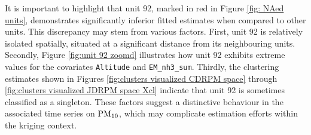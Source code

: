 \documentclass[12pt,	%
	a4paper,		%
	twoside,		%
	openright,		%
	titlepage,%
	]{book}
\theoremstyle{definition}
\begin{document}
It is important to highlight that unit 92, marked in red in Figure \ref{fig: NAed units}, demonstrates significantly inferior fitted estimates when compared to other units. This discrepancy may stem from various factors. First, unit 92 is relatively isolated spatially, situated at a significant distance from its neighbouring units. Secondly, Figure \ref{fig:unit 92 zoomd} illustrates how unit 92 exhibits extreme values for the covariates \texttt{Altitude} and \texttt{EM\_nh3\_sum}. Thirdly, the clustering estimates shown in Figures \ref{fig:clusters visualized CDRPM space} through \ref{fig:clusters visualized JDRPM space Xcl} indicate that unit 92 is sometimes classified as a singleton. These factors suggest a distinctive behaviour in the associated time series on $\text{PM}_{10}$, which may complicate estimation efforts within the kriging context.

\end{document}
